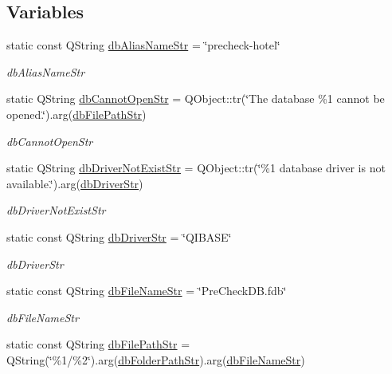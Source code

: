 \subsection*{Variables}
\begin{DoxyCompactItemize}
\item 
static const Q\-String \hyperlink{namespaceSimpleHotel_a3efec1eebc1e42b57c0a7f64176bb25d}{db\-Alias\-Name\-Str} = \char`\"{}precheck-\/hotel\char`\"{}
\begin{DoxyCompactList}\small\item\em db\-Alias\-Name\-Str \end{DoxyCompactList}\item 
static Q\-String \hyperlink{namespaceSimpleHotel_a432df3653afae1e72d3e6ce1cbbb7a63}{db\-Cannot\-Open\-Str} = Q\-Object\-::tr(\char`\"{}The database \%1 cannot be opened.\char`\"{}).arg(\hyperlink{namespaceSimpleHotel_a9d185fdd7e70bbd3e92512596899a6f8}{db\-File\-Path\-Str})
\begin{DoxyCompactList}\small\item\em db\-Cannot\-Open\-Str \end{DoxyCompactList}\item 
static Q\-String \hyperlink{namespaceSimpleHotel_a69c8ef43acac781f735932ee6026c913}{db\-Driver\-Not\-Exist\-Str} = Q\-Object\-::tr(\char`\"{}\%1 database driver is not available.\char`\"{}).arg(\hyperlink{namespaceSimpleHotel_a0cb9ef00bd18f8e9d5e7087865dc1cc3}{db\-Driver\-Str})
\begin{DoxyCompactList}\small\item\em db\-Driver\-Not\-Exist\-Str \end{DoxyCompactList}\item 
static const Q\-String \hyperlink{namespaceSimpleHotel_a0cb9ef00bd18f8e9d5e7087865dc1cc3}{db\-Driver\-Str} = \char`\"{}Q\-I\-B\-A\-S\-E\char`\"{}
\begin{DoxyCompactList}\small\item\em db\-Driver\-Str \end{DoxyCompactList}\item 
static const Q\-String \hyperlink{namespaceSimpleHotel_af1f81c1910383e17a678eb42e0bbcf69}{db\-File\-Name\-Str} = \char`\"{}Pre\-Check\-D\-B.\-fdb\char`\"{}
\begin{DoxyCompactList}\small\item\em db\-File\-Name\-Str \end{DoxyCompactList}\item 
static const Q\-String \hyperlink{namespaceSimpleHotel_a9d185fdd7e70bbd3e92512596899a6f8}{db\-File\-Path\-Str} = Q\-String(\char`\"{}\%1/\%2\char`\"{}).arg(\hyperlink{namespaceSimpleHotel_a78f69326b2ab0f42c50cc69fcc51336a}{db\-Folder\-Path\-Str}).arg(\hyperlink{namespaceSimpleHotel_af1f81c1910383e17a678eb42e0bbcf69}{db\-File\-Name\-Str})

\end{DoxyCompactItemize}
